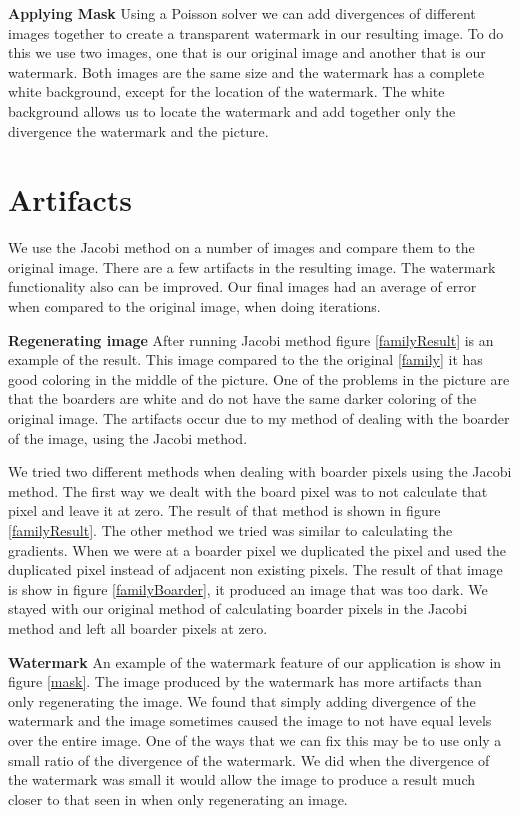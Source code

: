 \documentclass[10pt,twopage]{acmsiggraph}
\begin{document}
{\bf Applying Mask} Using a Poisson solver we can add divergences of different images together to create a transparent watermark in our resulting image. To do this we use two images, one that is our original image and another that is our watermark. Both images are the same size and the watermark has a complete white background, except for the location of the watermark. The white background allows us to locate the watermark and add together only the divergence the watermark and the picture.

\section{Artifacts}

We use the Jacobi method on a number of images and compare them to the original image. There are a few artifacts in the resulting image. The watermark functionality also can be improved. Our final images had an average of \result error when compared to the original image, when doing \iteration iterations.

{\bf Regenerating image} After running Jacobi method figure \ref{familyResult} is an example of the result. This image compared to the the original \ref{family} it has good coloring in the middle of the picture. One of the problems in the picture are that the boarders are white and do not have the same darker coloring of the original image. The artifacts occur due to my method of dealing with the boarder of the image, using the Jacobi method.

We tried two different methods when dealing with boarder pixels using the Jacobi method. The first way we dealt with the board pixel was to not calculate that pixel and leave it at zero. The result of that method is shown in figure \ref{familyResult}. The other method we tried was similar to calculating the gradients. When we were at a boarder pixel we duplicated the pixel and used the duplicated pixel instead of adjacent non existing pixels. The result of that image is show in figure \ref{familyBoarder}, it produced an image that was too dark. We stayed with our original method of calculating boarder pixels in the Jacobi method and left all boarder pixels at zero. 

{\bf Watermark} An example of the watermark feature of our application is show in figure \ref{mask}. The image produced by the watermark has more artifacts than only regenerating the image. We found that simply adding divergence of the watermark and the image sometimes caused the image to not have equal levels over the entire image. One of the ways that we can fix this may be to use only a small ratio of the divergence of the watermark. We did when the divergence of the watermark was small it would allow the image to produce a result much closer to that seen in when only regenerating an image.
\end{document}
